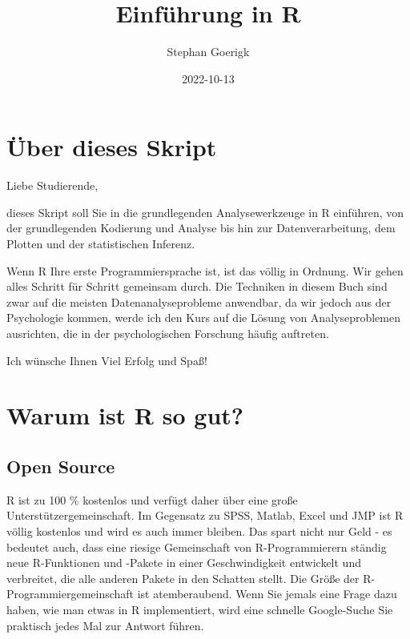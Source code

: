 \documentclass[
]{book}
\title{Einführung in R}
\author{Stephan Goerigk}
\date{2022-10-13}
\begin{document}
\maketitle

{
\setcounter{tocdepth}{1}
\tableofcontents
}
\hypertarget{uxfcber-dieses-skript}{%
\chapter*{Über dieses Skript}\label{uxfcber-dieses-skript}}

Liebe Studierende,

dieses Skript soll Sie in die grundlegenden Analysewerkzeuge in R einführen, von der grundlegenden Kodierung und Analyse bis hin zur Datenverarbeitung, dem Plotten und der statistischen Inferenz.

Wenn R Ihre erste Programmiersprache ist, ist das völlig in Ordnung. Wir gehen alles Schritt für Schritt gemeinsam durch. Die Techniken in diesem Buch sind zwar auf die meisten Datenanalyseprobleme anwendbar, da wir jedoch aus der Psychologie kommen, werde ich den Kurs auf die Lösung von Analyseproblemen ausrichten, die in der psychologischen Forschung häufig auftreten.

Ich wünsche Ihnen Viel Erfolg und Spaß!

\hypertarget{warum-ist-r-so-gut}{%
\chapter{Warum ist R so gut?}\label{warum-ist-r-so-gut}}

\hypertarget{open-source}{%
\section{Open Source}\label{open-source}}

R ist zu 100 \% kostenlos und verfügt daher über eine große Unterstützergemeinschaft. Im Gegensatz zu SPSS, Matlab, Excel und JMP ist R völlig kostenlos und wird es auch immer bleiben. Das spart nicht nur Geld - es bedeutet auch, dass eine riesige Gemeinschaft von R-Programmierern ständig neue R-Funktionen und -Pakete in einer Geschwindigkeit entwickelt und verbreitet, die alle anderen Pakete in den Schatten stellt. Die Größe der R-Programmiergemeinschaft ist atemberaubend. Wenn Sie jemals eine Frage dazu haben, wie man etwas in R implementiert, wird eine schnelle Google-Suche Sie praktisch jedes Mal zur Antwort führen.
\end{document}
